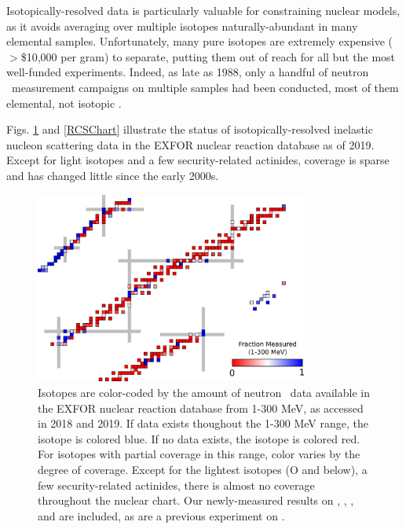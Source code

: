 Isotopically-resolved data is particularly valuable for constraining nuclear
models, as it avoids averaging over multiple isotopes naturally-abundant in many elemental samples.
Unfortunately, many pure isotopes are extremely expensive ($>$\$10,000 per gram) to
separate, putting them out of reach for all but the most well-funded experiments.
Indeed, as late as 1988, only a handful of neutron \tot\ measurement campaigns
on multiple samples had been conducted, most of them elemental, not isotopic
\cite{BrookhavenBook1988}.

Figs. \ref{TCSChart} and \ref{RCSChart} illustrate the status of isotopically-resolved inelastic
nucleon scattering data in the EXFOR nuclear reaction database as of 2019.
Except for light isotopes and a few security-related actinides, coverage is
sparse and has changed little since the early 2000s.

\begin{figure}
    \includegraphics[width=0.8\textwidth]{figures/TCSChart.png}
    \caption[Landscape of existing neutron \tot\ data in 2019]
    {Isotopes are color-coded by the amount of neutron \tot\ data available in the EXFOR nuclear
        reaction database from 1-300 MeV, as accessed in 2018 and 2019. If data exists thoughout the
        1-300 MeV range, the isotope
        is colored blue. If no data exists, the isotope is colored red. For
        isotopes with partial coverage in this range, color varies by the degree
        of coverage. Except for the lightest
        isotopes (O and below), a few security-related actinides, there is almost no coverage
        throughout the nuclear chart. Our newly-measured results on \oSixEight, \niEightFour,
        \rhThree, and \snTwelveFour are included, as are a previous experiment on
        \caAughtEight \cite{Shane2010}.
    }
    \label{TCSChart}
\end{figure}

